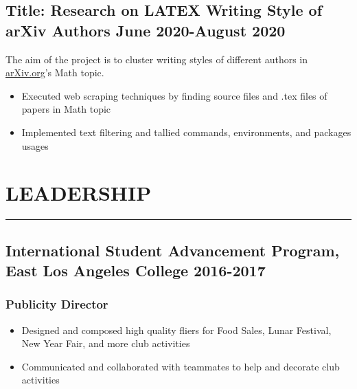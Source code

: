 \documentclass{article}
\newcommand{\divider}{\vskip2pt\hrule\vskip2pt}
\begin{document}
		\subsection*{Title: Research on LATEX Writing Style of arXiv Authors \hfill {\normalfont June 2020-August 2020}}
		\noindent
		\href{https://github.com/Anthonyive/machine-learning-project.git}{} The aim of the project is to cluster writing styles of different authors in \href{https://arxiv.org}{arXiv.org}’s Math topic.
		\begin{itemize}
			\setlength\itemsep{-1pt}
			\item Executed web scraping techniques by finding source files and .tex files of papers in Math topic
			\item Implemented text filtering and tallied commands, environments, and packages usages
		\end{itemize}
	
	\section*{LEADERSHIP}
	\divider
	\subsection*{International Student Advancement Program{\normalfont, East Los Angeles College \hfill 2016-2017}}
	\subsubsection*{Publicity Director}
	\begin{itemize}
		\setlength\itemsep{-1pt}
		\item Designed and composed high quality fliers for Food Sales, Lunar Festival, New Year Fair, and more club activities
		\item Communicated and collaborated with teammates to help and decorate club activities
	\end{itemize}
	
	
\end{document}
